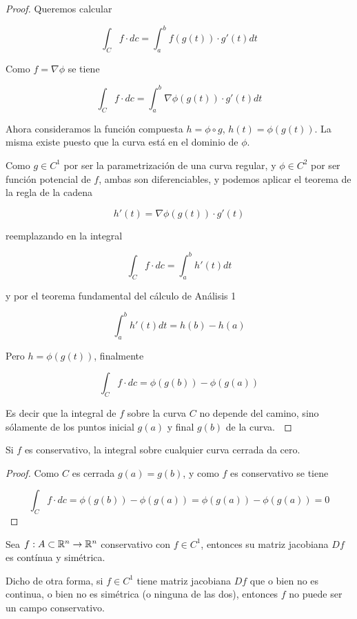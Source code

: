 \begin{proof}
Queremos calcular 

$$\int_C f \cdot dc = \int_a^b f(g(t)) \cdot g'(t) dt$$

Como $ f = \nabla \phi$ se tiene

$$\int_C f \cdot dc = \int_a^b \nabla \phi(g(t)) \cdot g'(t) dt$$

Ahora consideramos la función compuesta $ h = \phi \circ g$, $h(t) = \phi(g(t))$.  La misma existe puesto que la curva está en el dominio de $\phi$.

Como $g \in C^1$ por ser la parametrización de una curva regular, y $\phi \in C^2$ por ser función potencial de $f$, ambas son diferenciables, y podemos aplicar el teorema de la regla de la cadena

$$ h'(t) = \nabla \phi(g(t)) \cdot g'(t) $$

reemplazando en la integral

$$ \int_C f \cdot dc = \int_a^b h'(t) dt $$

y por el teorema fundamental del cálculo de Análisis 1

$$ \int_a^b h'(t) dt = h(b) - h(a) $$

Pero $h = \phi(g(t))$, finalmente

$$\int_C f \cdot dc = \phi(g(b)) - \phi(g(a))$$

Es decir que la integral de $f$ sobre la curva $C$ no depende del camino, sino sólamente de los puntos inicial $g(a)$ y final $g(b)$ de la curva. $\qedhere$
\end{proof}

\begin{corollary}
Si $f$ es conservativo, la integral sobre cualquier curva cerrada da cero.
\end{corollary}

\begin{proof}
Como $C$ es cerrada $ g(a) = g(b)$, y como $f$ es conservativo se tiene

$$ \int_C f \cdot dc = \phi(g(b)) - \phi(g(a)) = \phi(g(a)) - \phi(g(a)) = 0$$ 
\end{proof}

\begin{theorem}[Necesaria] \label{necesaria_potencial} 
Sea $f : A \subset \mathbb{R}^n \to \mathbb{R}^n$ conservativo con $ f \in C^1$, entonces su matriz jacobiana $Df$ es contínua y simétrica.
\end{theorem}

Dicho de otra forma, si $ f \in C^1$ tiene matriz jacobiana $Df$ que o bien no es continua, o bien no es simétrica (o ninguna de las dos), entonces $f$ no puede ser un campo conservativo.

